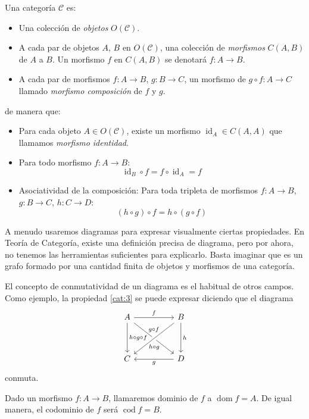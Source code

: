 \documentclass[12pt, twoside]{book}
\newcommand{\cat}{{\mathcal{C}}}
\DeclareMathOperator{\dom}{dom}
\DeclareMathOperator{\cod}{cod}
\DeclareMathOperator{\id}{id}
\begin{document}
\begin{definition}
Una categoría $\cat$ es:
\begin{itemize}
\item Una colección de \emph{objetos} $O(\cat)$.
\item A cada par de objetos $A$, $B$ en $O(\cat)$, una colección de \emph{morfismos} $C(A,B)$ de $A$ a $B$.
Un morfismo $f$ en $C(A,B)$ se denotará $f \colon A \to B$.
\item A cada par de morfismos $f \colon A \to B$, $g \colon B \to C$, un morfismo de $g \circ f \colon A \to C$ llamado \emph{morfismo composición} de $f$ y $g$.
\end{itemize}
de manera que:
\begin{itemize}
\item Para cada objeto $A \in O(\cat)$, existe un morfismo $\id_A \in C(A,A)$ que llamamos \emph{morfismo identidad}.
\item Para todo morfismo $f \colon A \to B$:
\[ \id_B \circ f = f \circ \id_A = f \]
\item Asociatividad de la composición: Para toda tripleta de morfismos $f \colon A \to B$, $g \colon B \to C$, $h \colon C \to D$:
\begin{equation}\label{cat:3} (h \circ g) \circ f = h \circ (g \circ f) \end{equation}
\end{itemize}
\end{definition}

A menudo usaremos diagramas para expresar visualmente ciertas propiedades.
En Teoría de Categoría, existe una definición precisa de diagrama, pero por ahora, no tenemos las herramientas suficientes para explicarlo.
Basta imaginar que es un grafo formado por una cantidad finita de objetos y morfismos de una categoría.

El concepto de conmutatividad de un diagrama es el habitual de otros campos.
Como ejemplo, la propiedad \eqref{cat:3} se puede expresar diciendo que el diagrama
\[
\begin{tikzcd}
A \arrow[rr,"f"]\arrow[rrdd,"g \circ f" above=5pt] \arrow[dd,"h\circ g \circ f"] & & B \arrow[lldd,"h\circ g" below=5pt, crossing over] \arrow[dd,"h"]\\
&\\
C & & D \arrow[ll,"g"]
\end{tikzcd}
\]
conmuta.

Dado un morfismo $f \colon A \to B$, llamaremos dominio de $f$ a $\dom f = A$.
De igual manera, el codominio de $f$ será $\cod f = B$.
\end{document}
